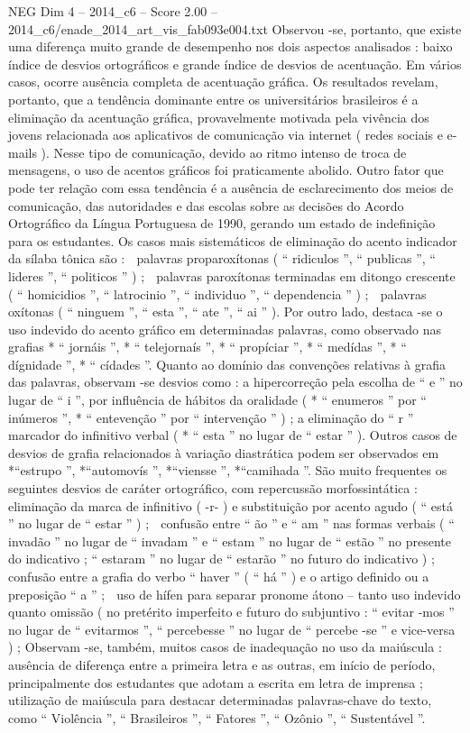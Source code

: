 \begin{textsample}{NEG Dim 4 – 2014\_c6 – Score 2.00 – 2014\_c6/enade\_2014\_art\_vis\_fab093e004.txt}
Observou -se, portanto, que existe uma diferença muito grande de desempenho nos dois aspectos analisados : baixo índice de desvios ortográficos e grande índice de desvios de acentuação.
Em vários casos, ocorre ausência completa de acentuação gráfica.
Os resultados revelam, portanto, que a tendência dominante entre os universitários brasileiros é a eliminação da acentuação gráfica, provavelmente motivada pela vivência dos jovens relacionada aos aplicativos de comunicação via internet ( redes sociais e e-mails ).
Nesse tipo de comunicação, devido ao ritmo intenso de troca de mensagens, o uso de acentos gráficos foi praticamente abolido.
Outro fator que pode ter relação com essa tendência é a ausência de esclarecimento dos meios de comunicação, das autoridades e das escolas sobre as decisões do Acordo Ortográfico da Língua Portuguesa de 1990, gerando um estado de indefinição para os estudantes.
Os casos mais sistemáticos de eliminação do acento indicador da sílaba tônica são :  palavras proparoxítonas ( “ ridiculos ”, “ publicas ”, “ lideres ”, “ politicos ” ) ;  palavras paroxítonas terminadas em ditongo crescente ( “ homicidios ”, “ latrocinio ”, “ individuo ”, “ dependencia ” ) ;  palavras oxítonas ( “ ninguem ”, “ esta ”, “ ate ”, “ ai ” ).
Por outro lado, destaca -se o uso indevido do acento gráfico em determinadas palavras, como observado nas grafias * “ jornáis ”, * “ telejornaís ”, * “ propíciar ”, * “ medídas ”, * “ dígnidade ”, * “ cídades ”.
Quanto ao domínio das convenções relativas à grafia das palavras, observam -se desvios como : a hipercorreção pela escolha de “ e ” no lugar de “ i ”, por influência de hábitos da oralidade ( * “ enumeros ” por “ inúmeros ”, * “ entevenção ” por “ intervenção ” ) ; a eliminação do “ r ” marcador do infinitivo verbal ( * “ esta ” no lugar de “ estar ” ).
Outros casos de desvios de grafia relacionados à variação diastrática podem ser observados em *“estrupo ”, *“automovís ”, *“viensse ”, *“camihada ”.
São muito frequentes os seguintes desvios de caráter ortográfico, com repercussão morfossintática :  eliminação da marca de infinitivo ( -r- ) e substituição por acento agudo ( “ está ” no lugar de “ estar ” ) ;  confusão entre “ ão ” e “ am ” nas formas verbais ( “ invadão ” no lugar de “ invadam ” e “ estam ” no lugar de “ estão ” no presente do indicativo ; “ estaram ” no lugar de “ estarão ” no futuro do indicativo ) ;  confusão entre a grafia do verbo “ haver ” ( “ há ” ) e o artigo definido ou a preposição “ a ” ;  uso de hífen para separar pronome átono – tanto uso indevido quanto omissão ( no pretérito imperfeito e futuro do subjuntivo : “ evitar -mos ” no lugar de “ evitarmos ”, “ percebesse ” no lugar de “ percebe -se ” e vice-versa ) ; Observam -se, também, muitos casos de inadequação no uso da maiúscula : ausência de diferença entre a primeira letra e as outras, em início de período, principalmente dos estudantes que adotam a escrita em letra de imprensa ; utilização de maiúscula para destacar determinadas palavras-chave do texto, como “ Violência ”, “ Brasileiros ”, “ Fatores ”, “ Ozônio ”, “ Sustentável ”.

\end{textsample}
